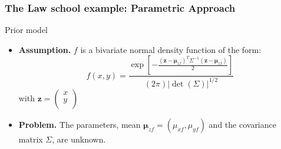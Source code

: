 \frame
{
\frametitle{The Law school example: Parametric Approach}

\begin{exampleblock}{Prior model}
\begin{itemize}
\item \textbf{Assumption.} $f$ is a bivariate normal density function of the form:
$$ 
f(x,y)=\frac{\exp\left\lbrack -\frac{(\mathbf{z}-\pmb{\mu}_{zf})^{T} \Sigma^{-1} (\mathbf{z}-\pmb{\mu}_{zf})}{2} 
\right\rbrack
}{(2\pi) |\det(\Sigma)|^{1/2}}
$$ 
with 
$
\mathbf{z}=
\left(
\begin{array}{c}
x\\
y\\
\end{array}\right)
$
\item \textbf{Problem.} The parameters, mean  $\pmb{\mu}_{zf}=(\mu_{xf},\mu_{yf})$ and  the covariance matrix $\Sigma$, are unknown. 
\end{itemize}
\end{exampleblock}
}

